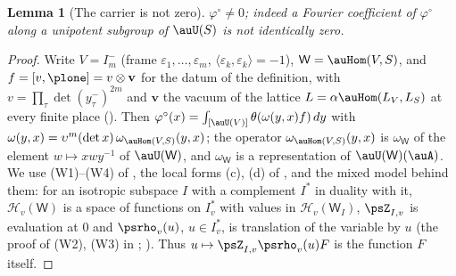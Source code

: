 \documentclass[10pt]{amsart}
\newtheorem{lemma}[theorem]{Lemma}
\theoremstyle{definition}
\theoremstyle{remark}
\providecommand{\psHS}{\mathcal H}
\providecommand{\psvac}{\mathbf v}
\begin{document}
\begin{lemma}[The carrier is not zero]\label{pte:carriernz}
$\varphi^\circ\ne0$; indeed a Fourier coefficient of $\varphi^\circ$ along a unipotent subgroup of
$\auU(S)$ is not identically zero.
\end{lemma}
\begin{proof}
Write $V=I_m^-$ (frame $\varepsilon_1,\dots,\varepsilon_m$, $\langle\varepsilon_k,\varepsilon_k\rangle=-1$),
$\mathsf W=\auHom(V,S)$, and $f=[v,\plone]=v\otimes\psvac$ for the datum of the definition, with
$v=\prod_\tau\det(y^-_\tau)^{2m}$ and $\psvac$ the vacuum of the lattice $L=\alpha\auHom(L_V,L_S)$ at every
finite place ({\cite[\S2.3]{P53}}). Then $\varphi^\circ(x)=\int_{[\auU(V)]}\theta(\omega(y,x)f)\,dy$ with
$\omega(y,x)=\upsilon^m(\det x)\,\omega_{\auHom(V,S)}(y,x)$; the operator $\omega_{\auHom(V,S)}(y,x)$ is
$\omega_{\mathsf W}$ of the element $w\mapsto xwy^{-1}$ of $\auU(\mathsf W)$, and $\omega_{\mathsf W}$ is a
representation of $\auU(\mathsf W)(\auA)$. We use (W1)--(W4) of {\cite[Lemma~5.2]{P49}}, the local forms
(c), (d) of {\cite[Proposition~2.14]{P49}}, and the mixed model behind them: for an isotropic subspace $I$ with
a complement $I^*$ in duality with it, $\psHS_v(\mathsf W)$ is a space of functions on $I^*_v$ with values
in $\psHS_v(\mathsf W_I)$, $\psZ_{I,v}$ is evaluation at $0$ and $\psrho_v(u)$, $u\in I^*_v$, is translation
of the variable by $u$ (the proof of (W2), (W3) in {\cite[Lemma~5.2]{P49}}; {\cite[Proposition~2.14]{P49}}). Thus
$u\mapsto\psZ_{I,v}\psrho_v(u)F$ is the function $F$ itself.


\end{proof}
\end{document}
